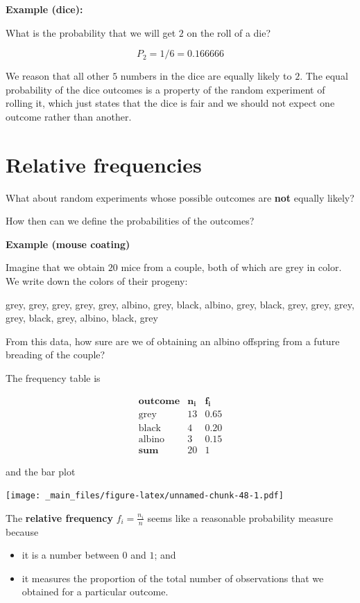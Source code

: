 \documentclass[
]{book}
\providecommand{\tightlist}{%
  \setlength{\itemsep}{0pt}\setlength{\parskip}{0pt}}
\begin{document}
\textbf{Example (dice):}

What is the probability that we will get \(2\) on the roll of a die?

\[P_2=1/6=0.166666\]

We reason that all other \(5\) numbers in the dice are equally likely to \(2\). The equal probability of the dice outcomes is a property of the random experiment of rolling it, which just states that the dice is fair and we should not expect one outcome rather than another.

\hypertarget{relative-frequencies-1}{%
\section{Relative frequencies}\label{relative-frequencies-1}}

What about random experiments whose possible outcomes are \textbf{not} equally likely?

How then can we define the probabilities of the outcomes?

\textbf{Example (mouse coating)}

Imagine that we obtain \(20\) mice from a couple, both of which are grey in color. We write down the colors of their progeny:

grey, grey, grey, grey, grey, albino, grey, black, albino, grey, black, grey, grey, grey, grey, black, grey, albino, black, grey

From this data, how sure are we of obtaining an albino offspring from a future breading of the couple?

The frequency table is

\[
\begin{array}{ccc}
\mathbf{outcome} & \mathbf{n_i} & \mathbf{f_i} \\
\text{grey}  & 13    & 0.65  \\
\text{black}   & 4     & 0.20  \\ 
\text{albino}  & 3     & 0.15  \\ \hline
\mathbf{sum} & 20 & 1
\end{array}
\]

and the bar plot

\texttt{[image: \_main\_files/figure-latex/unnamed-chunk-48-1.pdf]}

The \textbf{relative frequency} \(f_i =\frac{n_ i}{n}\) seems like a reasonable probability measure because

\begin{itemize}
\tightlist
\item
  it is a number between \(0\) and \(1\); and
\item
  it measures the proportion of the total number of observations that we obtained for a particular outcome.
\end{itemize}
\end{document}
